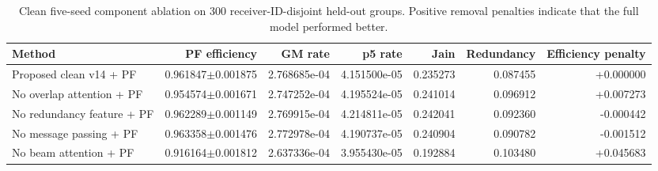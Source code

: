 \begin{table}[t]
\centering
\caption{Clean five-seed component ablation on 300 receiver-ID-disjoint held-out groups. Positive removal penalties indicate that the full model performed better.}
\label{tab:clean_component_ablation}
\begin{tabular}{lrrrrrr}
\toprule
Method & PF efficiency & GM rate & p5 rate & Jain & Redundancy & Efficiency penalty \\
\midrule
Proposed clean v14 + PF & 0.961847$\pm$0.001875 & 2.768685e-04 & 4.151500e-05 & 0.235273 & 0.087455 & +0.000000 \\
No overlap attention + PF & 0.954574$\pm$0.001671 & 2.747252e-04 & 4.195524e-05 & 0.241014 & 0.096912 & +0.007273 \\
No redundancy feature + PF & 0.962289$\pm$0.001149 & 2.769915e-04 & 4.214811e-05 & 0.242041 & 0.092360 & -0.000442 \\
No message passing + PF & 0.963358$\pm$0.001476 & 2.772978e-04 & 4.190737e-05 & 0.240904 & 0.090782 & -0.001512 \\
No beam attention + PF & 0.916164$\pm$0.001812 & 2.637336e-04 & 3.955430e-05 & 0.192884 & 0.103480 & +0.045683 \\
\bottomrule
\end{tabular}
\end{table}